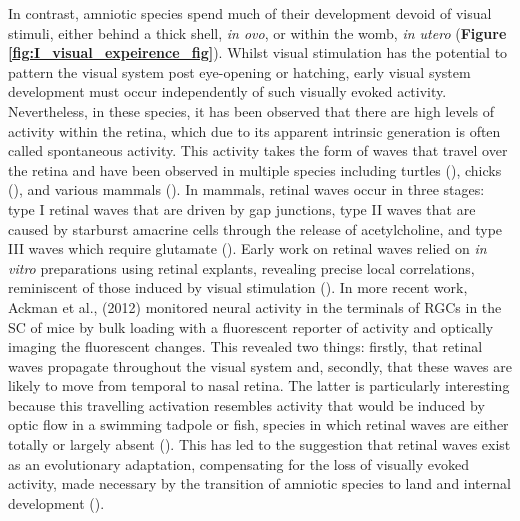 In contrast, amniotic species spend much of their development devoid of visual stimuli, either behind a thick shell, \textit{in ovo}, or within the womb, \textit{in utero} (\textbf{Figure \ref{fig:I_visual_expeirence_fig}}). Whilst visual stimulation has the potential to pattern the visual system post eye-opening or hatching, early visual system development must occur independently of such visually evoked activity. Nevertheless, in these species, it has been observed that there are high levels of  activity within the retina, which due to its apparent intrinsic generation is often called spontaneous activity. This activity takes the form of waves that travel over the retina and have been observed in multiple species including turtles (\cite{Sernagor1996InfluenceFields}), chicks (\cite{Wong1998DevelopmentallyRetina}), and various mammals (\cite{Meister1991SynchronousRetina, Wong1993TransientRetina, Torborg2005SpontaneousProjections, Ackman2012RetinalSystem, Warland2006DynamicsPathways}). In mammals, retinal waves occur in three stages: type I retinal waves that are driven by gap junctions, type II waves that are caused by starburst amacrine cells through the release of acetylcholine, and type III waves which require glutamate (\cite{Torborg2005SpontaneousProjections, Bansal2000MiceRetina, Kerschensteiner2016GlutamatergicWaves, Syed2004Stage-dependentRetina}). Early work on retinal waves relied on \textit{in vitro} preparations using retinal explants, revealing precise local correlations, reminiscent of those induced by visual stimulation  (\cite{Meister1991SynchronousRetina, Wong1993TransientRetina, Feller1996RequirementWaves}). In more recent work, Ackman et al., (2012) monitored neural activity in the terminals of RGCs in the SC of mice by bulk loading with a fluorescent reporter of activity and optically imaging the fluorescent changes. This revealed two things: firstly, that retinal waves propagate throughout the visual system and, secondly, that these waves are likely to move from temporal to nasal retina. The latter is particularly interesting because this travelling activation resembles activity that would be induced by optic flow in a swimming tadpole or fish, species in which retinal waves are either totally or largely absent (\cite{Kutsarova2017RulesBrain}). This has led to the suggestion that retinal waves exist as an evolutionary adaptation, compensating for the loss of visually evoked activity, made necessary by the transition of amniotic species to land and internal development (\cite{Pratt2016AnDevelopment}). 

